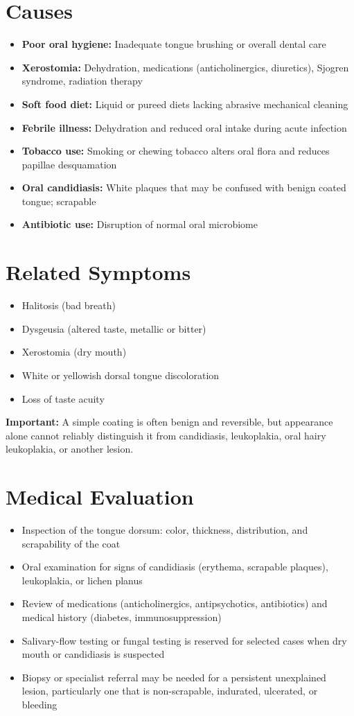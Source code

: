 \section*{Causes}
\begin{itemize}
  \item \textbf{Poor oral hygiene:} Inadequate tongue brushing or overall dental care
  \item \textbf{Xerostomia:} Dehydration, medications (anticholinergics, diuretics), Sjogren syndrome, radiation therapy
  \item \textbf{Soft food diet:} Liquid or pureed diets lacking abrasive mechanical cleaning
  \item \textbf{Febrile illness:} Dehydration and reduced oral intake during acute infection
  \item \textbf{Tobacco use:} Smoking or chewing tobacco alters oral flora and reduces papillae desquamation
  \item \textbf{Oral candidiasis:} White plaques that may be confused with benign coated tongue; scrapable
  \item \textbf{Antibiotic use:} Disruption of normal oral microbiome
\end{itemize}

\section*{Related Symptoms}
\begin{itemize}
  \item Halitosis (bad breath)
  \item Dysgeusia (altered taste, metallic or bitter)
  \item Xerostomia (dry mouth)
  \item White or yellowish dorsal tongue discoloration
  \item Loss of taste acuity
\end{itemize}
\textbf{Important:} A simple coating is often benign and reversible, but appearance alone cannot reliably distinguish it from candidiasis, leukoplakia, oral hairy leukoplakia, or another lesion.

\section*{Medical Evaluation}
\begin{itemize}
  \item Inspection of the tongue dorsum: color, thickness, distribution, and scrapability of the coat
  \item Oral examination for signs of candidiasis (erythema, scrapable plaques), leukoplakia, or lichen planus
  \item Review of medications (anticholinergics, antipsychotics, antibiotics) and medical history (diabetes, immunosuppression)
  \item Salivary-flow testing or fungal testing is reserved for selected cases when dry mouth or candidiasis is suspected
  \item Biopsy or specialist referral may be needed for a persistent unexplained lesion, particularly one that is non-scrapable, indurated, ulcerated, or bleeding
\end{itemize}

